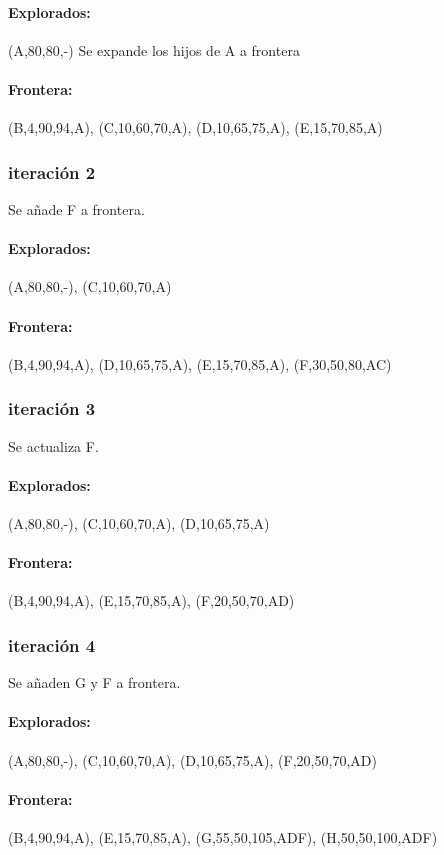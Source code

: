 \documentclass[a4paper,10pt]{article}
\begin{document}
\paragraph{Explorados:}(A,80,80,-)
Se expande los hijos de A a frontera
\paragraph{Frontera:}(B,4,90,94,A), (C,10,60,70,A), (D,10,65,75,A), (E,15,70,85,A)

\subsubsection{iteración 2}
Se añade F a frontera.
\paragraph{Explorados:}(A,80,80,-), (C,10,60,70,A)
\paragraph{Frontera:}(B,4,90,94,A), (D,10,65,75,A), (E,15,70,85,A), (F,30,50,80,AC)

\subsubsection{iteración 3}
Se actualiza F.
\paragraph{Explorados:}(A,80,80,-), (C,10,60,70,A), (D,10,65,75,A)
\paragraph{Frontera:}(B,4,90,94,A), (E,15,70,85,A), (F,20,50,70,AD)

\subsubsection{iteración 4}
Se añaden G y F a frontera.
\paragraph{Explorados:}(A,80,80,-), (C,10,60,70,A), (D,10,65,75,A), (F,20,50,70,AD)
\paragraph{Frontera:}(B,4,90,94,A), (E,15,70,85,A), (G,55,50,105,ADF), (H,50,50,100,ADF)
\end{document}
